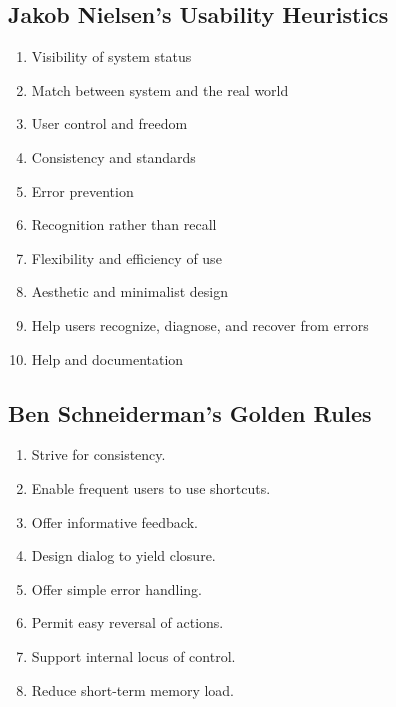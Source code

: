 \subsection{Jakob Nielsen's Usability Heuristics}
\begin{enumerate}
	\item Visibility of system status
	\item Match between system and the real world
	\item User control and freedom
	\item Consistency and standards
	\item Error prevention
	\item Recognition rather than recall
	\item Flexibility and efficiency of use
	\item Aesthetic and minimalist design
	\item Help users recognize, diagnose, and recover from errors
	\item Help and documentation
\end{enumerate}

\subsection{Ben Schneiderman's Golden Rules}
\begin{enumerate}
	\item Strive for consistency.
	\item Enable frequent users to use shortcuts.
	\item Offer informative feedback.
	\item Design dialog to yield closure.
	\item Offer simple error handling.
	\item Permit easy reversal of actions.
	\item Support internal locus of control.
	\item Reduce short-term memory load.
\end{enumerate}



